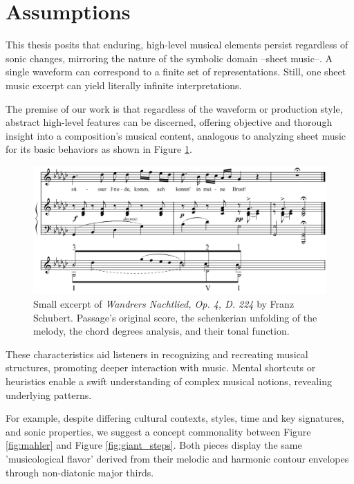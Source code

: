 \section{Assumptions}

This thesis posits that enduring, high-level musical elements persist regardless of sonic changes, mirroring the nature of the symbolic domain --sheet music--. A single waveform can correspond to a finite set of representations. Still, one sheet music excerpt can yield literally infinite interpretations.

The premise of our work is that regardless of the waveform or production style, abstract high-level features can be discerned, offering objective and thorough insight into a composition's musical content, analogous to analyzing sheet music for its basic behaviors as shown in Figure \ref{fig:Wandrers Nachtlied, Op. 4, D. 224}.


\begin{figure}[ht]
\includegraphics[clip,width=\columnwidth]{figures/schenkerian analysis/SchubertOp4no3.png}%
\caption[Excerpt of \textit{Wandrers Nachtlied, Op. 4, D. 224} by Franz Schubert.]{\small{Small excerpt of \textit{Wandrers Nachtlied, Op. 4, D. 224} by Franz Schubert. Passage's original score, the schenkerian unfolding of the melody, the chord degrees analysis, and their tonal function.}}
\label{fig:Wandrers Nachtlied, Op. 4, D. 224}
\end{figure}


These characteristics aid listeners in recognizing and recreating musical structures, promoting deeper interaction with music. Mental shortcuts or heuristics enable a swift understanding of complex musical notions, revealing underlying patterns.

For example, despite differing cultural contexts, styles, time and key signatures, and sonic properties, we suggest a concept commonality between Figure \ref{fig:mahler} and Figure \ref{fig:giant_steps}. Both pieces display the same 'musicological flavor' derived from their melodic and harmonic contour envelopes through non-diatonic major thirds.


